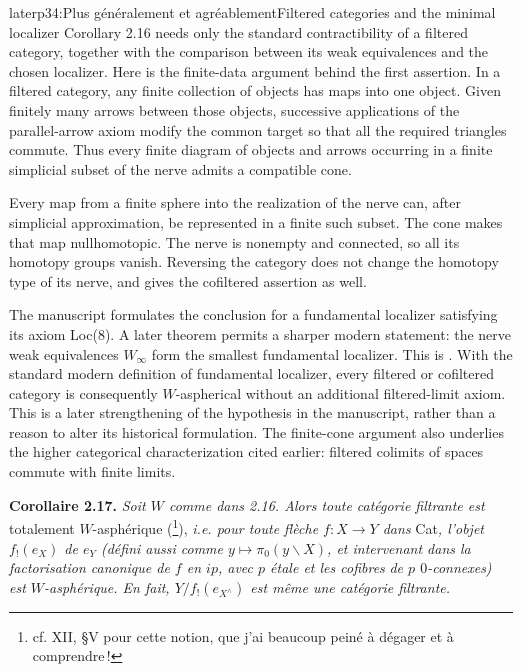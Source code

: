 \begin{dcomment}{later}{p34:Plus généralement et agréablement}{Filtered categories and the minimal localizer}
Corollary 2.16 needs only the standard contractibility of a filtered category, together with the comparison between its weak equivalences and the chosen localizer. Here is the finite-data argument behind the first assertion. In a filtered category, any finite collection of objects has maps into one object. Given finitely many arrows between those objects, successive applications of the parallel-arrow axiom modify the common target so that all the required triangles commute. Thus every finite diagram of objects and arrows occurring in a finite simplicial subset of the nerve admits a compatible cone.

Every map from a finite sphere into the realization of the nerve can, after simplicial approximation, be represented in a finite such subset. The cone makes that map nullhomotopic. The nerve is nonempty and connected, so all its homotopy groups vanish. Reversing the category does not change the homotopy type of its nerve, and gives the cofiltered assertion as well.

The manuscript formulates the conclusion for a fundamental localizer satisfying its axiom Loc(8). A later theorem permits a sharper modern statement: the nerve weak equivalences $W_\infty$ form the smallest fundamental localizer. This is \citet[Theorem 2.2.11, p.~136]{Cisinski2004Minimal}. With the standard modern definition of fundamental localizer, every filtered or cofiltered category is consequently $W$-aspherical without an additional filtered-limit axiom. This is a later strengthening of the hypothesis in the manuscript, rather than a reason to alter its historical formulation. The finite-cone argument also underlies the higher categorical characterization cited earlier: filtered colimits of spaces commute with finite limits.
\end{dcomment}


\noindent\textbf{Corollaire 2.17.} \textit{Soit $W$ comme dans 2.16. Alors toute catégorie filtrante est} totalement $W$-asphérique (\footnote[40]{cf. XII, §V pour cette notion, que j'ai beaucoup peiné à dégager et à comprendre\,!}), \textit{i.e. pour toute flèche $f : X \longrightarrow Y$ dans} Cat\textit{, l'objet $f_!(e_X)$ de $e_Y$ (défini aussi comme $y \longmapsto \pi_0(y\backslash X)$, et intervenant dans la factorisation canonique de $f$ en $ip$, avec $p$ étale et les cofibres} \textit{de $p$ $0$-connexes)}  \textit{est $W$-asphérique. En fait, $Y/f_!(e_{X^\wedge})$ est même une catégorie filtrante.}

